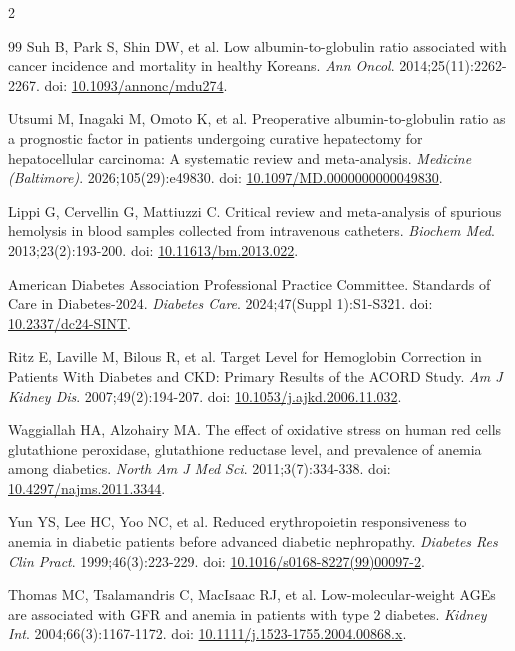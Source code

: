 \documentclass[10pt,letterpaper]{article}
\begin{document}
\begin{multicols}{2}
\begin{thebibliography}{99}
 Suh B, Park S, Shin DW, et al. Low albumin-to-globulin ratio associated with cancer incidence and mortality in healthy Koreans. \textit{Ann Oncol}. 2014;25(11):2262-2267. doi: \href{https://doi.org/10.1093/annonc/mdu274}{10.1093/annonc/mdu274}.

 Utsumi M, Inagaki M, Omoto K, et al. Preoperative albumin-to-globulin ratio as a prognostic factor in patients undergoing curative hepatectomy for hepatocellular carcinoma: A systematic review and meta-analysis. \textit{Medicine (Baltimore)}. 2026;105(29):e49830. doi: \href{https://doi.org/10.1097/MD.0000000000049830}{10.1097/MD.0000000000049830}.

 Lippi G, Cervellin G, Mattiuzzi C. Critical review and meta-analysis of spurious hemolysis in blood samples collected from intravenous catheters. \textit{Biochem Med}. 2013;23(2):193-200. doi: \href{https://doi.org/10.11613/bm.2013.022}{10.11613/bm.2013.022}.

 American Diabetes Association Professional Practice Committee. Standards of Care in Diabetes-2024. \textit{Diabetes Care}. 2024;47(Suppl 1):S1-S321. doi: \href{https://doi.org/10.2337/dc24-SINT}{10.2337/dc24-SINT}.

 Ritz E, Laville M, Bilous R, et al. Target Level for Hemoglobin Correction in Patients With Diabetes and CKD: Primary Results of the ACORD Study. \textit{Am J Kidney Dis}. 2007;49(2):194-207. doi: \href{https://doi.org/10.1053/j.ajkd.2006.11.032}{10.1053/j.ajkd.2006.11.032}.

 Waggiallah HA, Alzohairy MA. The effect of oxidative stress on human red cells glutathione peroxidase, glutathione reductase level, and prevalence of anemia among diabetics. \textit{North Am J Med Sci}. 2011;3(7):334-338. doi: \href{https://doi.org/10.4297/najms.2011.3344}{10.4297/najms.2011.3344}.

 Yun YS, Lee HC, Yoo NC, et al. Reduced erythropoietin responsiveness to anemia in diabetic patients before advanced diabetic nephropathy. \textit{Diabetes Res Clin Pract}. 1999;46(3):223-229. doi: \href{https://doi.org/10.1016/s0168-8227(99)00097-2}{10.1016/s0168-8227(99)00097-2}.

 Thomas MC, Tsalamandris C, MacIsaac RJ, et al. Low-molecular-weight AGEs are associated with GFR and anemia in patients with type 2 diabetes. \textit{Kidney Int}. 2004;66(3):1167-1172. doi: \href{https://doi.org/10.1111/j.1523-1755.2004.00868.x}{10.1111/j.1523-1755.2004.00868.x}.


\end{thebibliography}
\end{multicols}
\end{document}
